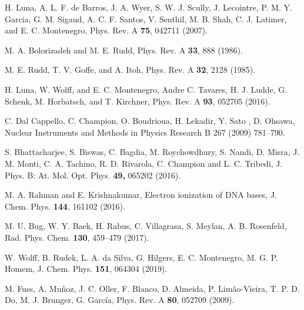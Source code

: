 \documentclass[10pt,showpacs,showkeys,twocolumn]{revtex4}
\begin{document}
\begin{thebibliography}{}
H. Luna, A. L. F. de Barros, J. A. Wyer, S. W. J. Scully, J. Lecointre, P. M. Y. Garcia, G. M. Sigaud, A. C. F. Santos,
V. Senthil, M. B. Shah, C. J. Latimer, and E. C. Montenegro,
Phys. Rev. A \textbf{75}, 042711 (2007).


 M. A. Bolorizadeh and M. E. Rudd, Phys. Rev. A \textbf{33}, 888 (1986). 




 M. E. Rudd, T. V. Goffe, and A. Itoh,  Phys. Rev. A \textbf{32}, 2128 (1985).


 H. Luna, W. Wolff, and E. C. Montenegro, Andre C. Tavares, H. J. Ludde, G. Schenk, M. Horbatsch, and T. Kirchner, Phys. Rev. A \textbf{93}, 052705 (2016).  

C. Dal Cappello, C. Champion, O. Boudrioua, H. Lekadir, Y. Sato , D. Ohsawa, 
Nuclear Instruments and Methods in Physics Research B 267 (2009) 781--790.

 S. Bhattacharjee, S. Biswas, C. Bagdia, M. Roychowdhury, S. Nandi, D. Misra, J. M. Monti, C. A. Tachino, R. D. Rivarola, C. Champion and L. C. Tribedi, J. Phys. B: At. Mol. Opt. Phys. \textbf{49,}  065202 (2016).



M. A. Rahman and E. Krishnakumar,
Electron ionization of DNA bases,
J. Chem. Phys. \textbf{144}, 161102 (2016).


M. U. Bug, W. Y. Baek, H. Rabus, C. Villagrasa, S. Meylan, A. B. Rosenfeld,
Rad. Phys. Chem. \textbf{130}, 459--479 (2017).


W. Wolff, B. Rudek, L. A. da Silva, G. Hilgers, E. C. Montenegro, 
M. G. P. Homem,
J. Chem. Phys. \textbf{151}, 064304 (2019).

M. Fuss, A. Muñoz, J. C. Oller, F. Blanco, D. Almeida, P. Limão-Vieira, 
T. P. D. Do, M. J. Brunger, G. Garc\'{i}a,
Phys. Rev. A \textbf{80}, 052709 (2009).


\end{thebibliography}
\end{document}
